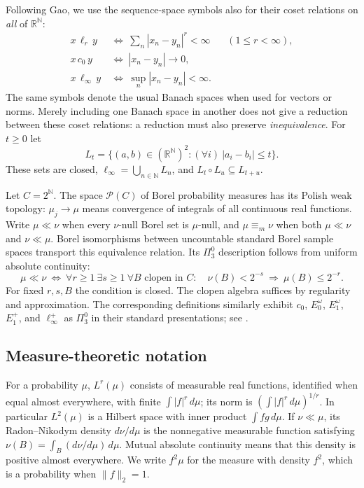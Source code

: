 \documentclass[11pt]{article}
\numberwithin{equation}{section}
\theoremstyle{definition}
\newcommand{\N}{\mathbb N}
\newcommand{\R}{\mathbb R}
\newcommand{\Prob}{\mathcal P}
\newcommand{\meq}{\equiv_m}
\begin{document}
Following Gao, we use the sequence-space symbols also for their
coset relations on \emph{all} of $\R^\N$:
\[
\begin{aligned}
x\,\ell_r\,y &\ \Longleftrightarrow\
       \sum_n|x_n-y_n|^r<\infty &&(1\le r<\infty),\\
x\,c_0\,y &\ \Longleftrightarrow\
       |x_n-y_n|\longrightarrow0,\\
x\,\ell_\infty\,y &\ \Longleftrightarrow\
       \sup_n|x_n-y_n|<\infty .
\end{aligned}
\]
The same symbols denote the usual Banach spaces when used for
vectors or norms. Merely including one Banach space in another
does not give a reduction between these coset relations:
a reduction must also preserve \emph{inequivalence}.
For $t\ge0$ let
\[
 L_t=\{(a,b)\in(\R^\N)^2:(\forall i)\ |a_i-b_i|\le t\}.
\]
These sets are closed,
$\ell_\infty=\bigcup_{n\in\N}L_n$, and
$L_t\circ L_u\subseteq L_{t+u}$.

Let $C=2^\N$. The space $\Prob(C)$ of Borel probability measures
has its Polish weak topology: $\mu_j\to\mu$ means convergence
of integrals of all continuous real functions.
Write $\mu\ll\nu$ when every $\nu$-null Borel set is $\mu$-null,
and $\mu\meq\nu$ when both $\mu\ll\nu$ and $\nu\ll\mu$.
Borel isomorphisms between uncountable standard Borel sample spaces
transport this equivalence relation.
Its $\Pi^0_3$ description follows from uniform absolute continuity:
\[
\mu\ll\nu\ \Longleftrightarrow\
\forall r\ge1\ \exists s\ge1\ \forall B\text{ clopen in }C:
\quad \nu(B)<2^{-s}\ \Longrightarrow\ \mu(B)\le2^{-r}.
\]
For fixed $r,s,B$ the condition is closed.
The clopen algebra suffices by regularity and approximation.
The corresponding definitions similarly exhibit $c_0$,
$E_0^\omega$, $E_1^\omega$, $E_1^+$, and $\ell_\infty^+$
as $\Pi^0_3$ in their standard presentations; see \cite{Gao}.

\subsection{Measure-theoretic notation}
For a probability $\mu$, $L^r(\mu)$ consists of measurable real
functions, identified when equal almost everywhere, with finite
$\int|f|^r\,d\mu$; its norm is
$(\int|f|^r\,d\mu)^{1/r}$. In particular $L^2(\mu)$ is a
Hilbert space with inner product $\int fg\,d\mu$.
If $\nu\ll\mu$, its Radon--Nikodym density $d\nu/d\mu$
is the nonnegative measurable function satisfying
$\nu(B)=\int_B(d\nu/d\mu)\,d\mu$.
Mutual absolute continuity means that this density is positive
almost everywhere. We write $f^2\mu$ for the measure with density
$f^2$, which is a probability when $\|f\|_2=1$.
\end{document}
